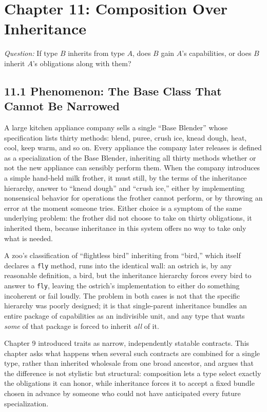 \documentclass[11pt]{book}
\begin{document}
\clearpage

\chapter*{Chapter 11: Composition Over Inheritance}

\begin{firstprinciples}
\textit{Question:} If type $B$ inherits from type $A$, does $B$ gain $A$'s capabilities, or does $B$ inherit $A$'s obligations along with them?
\end{firstprinciples}

\section*{11.1 Phenomenon: The Base Class That Cannot Be Narrowed}

A large kitchen appliance company sells a single ``Base Blender'' whose specification lists thirty methods: blend, puree, crush ice, knead dough, heat, cool, keep warm, and so on. Every appliance the company later releases is defined as a specialization of the Base Blender, inheriting all thirty methods whether or not the new appliance can sensibly perform them. When the company introduces a simple hand-held milk frother, it must still, by the terms of the inheritance hierarchy, answer to ``knead dough'' and ``crush ice,'' either by implementing nonsensical behavior for operations the frother cannot perform, or by throwing an error at the moment someone tries. Either choice is a symptom of the same underlying problem: the frother did not choose to take on thirty obligations, it inherited them, because inheritance in this system offers no way to take only what is needed.

A zoo's classification of ``flightless bird'' inheriting from ``bird,'' which itself declares a \texttt{fly} method, runs into the identical wall: an ostrich is, by any reasonable definition, a bird, but the inheritance hierarchy forces every bird to answer to \texttt{fly}, leaving the ostrich's implementation to either do something incoherent or fail loudly. The problem in both cases is not that the specific hierarchy was poorly designed; it is that single-parent inheritance bundles an entire package of capabilities as an indivisible unit, and any type that wants \emph{some} of that package is forced to inherit \emph{all} of it.

Chapter 9 introduced traits as narrow, independently statable contracts. This chapter asks what happens when several such contracts are combined for a single type, rather than inherited wholesale from one broad ancestor, and argues that the difference is not stylistic but structural: composition lets a type select exactly the obligations it can honor, while inheritance forces it to accept a fixed bundle chosen in advance by someone who could not have anticipated every future specialization.
\end{document}
